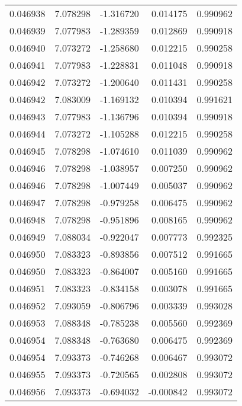\begin{tabular}{lrrrr}
0.046938    &  7.078298 & -1.316720 &  0.014175 &             0.990962 \\
0.046939    &  7.077983 & -1.289359 &  0.012869 &             0.990918 \\
0.046940    &  7.073272 & -1.258680 &  0.012215 &             0.990258 \\
0.046941    &  7.077983 & -1.228831 &  0.011048 &             0.990918 \\
0.046942    &  7.073272 & -1.200640 &  0.011431 &             0.990258 \\
0.046942    &  7.083009 & -1.169132 &  0.010394 &             0.991621 \\
0.046943    &  7.077983 & -1.136796 &  0.010394 &             0.990918 \\
0.046944    &  7.073272 & -1.105288 &  0.012215 &             0.990258 \\
0.046945    &  7.078298 & -1.074610 &  0.011039 &             0.990962 \\
0.046946    &  7.078298 & -1.038957 &  0.007250 &             0.990962 \\
0.046946    &  7.078298 & -1.007449 &  0.005037 &             0.990962 \\
0.046947    &  7.078298 & -0.979258 &  0.006475 &             0.990962 \\
0.046948    &  7.078298 & -0.951896 &  0.008165 &             0.990962 \\
0.046949    &  7.088034 & -0.922047 &  0.007773 &             0.992325 \\
0.046950    &  7.083323 & -0.893856 &  0.007512 &             0.991665 \\
0.046950    &  7.083323 & -0.864007 &  0.005160 &             0.991665 \\
0.046951    &  7.083323 & -0.834158 &  0.003078 &             0.991665 \\
0.046952    &  7.093059 & -0.806796 &  0.003339 &             0.993028 \\
0.046953    &  7.088348 & -0.785238 &  0.005560 &             0.992369 \\
0.046954    &  7.088348 & -0.763680 &  0.006475 &             0.992369 \\
0.046954    &  7.093373 & -0.746268 &  0.006467 &             0.993072 \\
0.046955    &  7.093373 & -0.720565 &  0.002808 &             0.993072 \\
0.046956    &  7.093373 & -0.694032 & -0.000842 &             0.993072 \\

\end{tabular}

